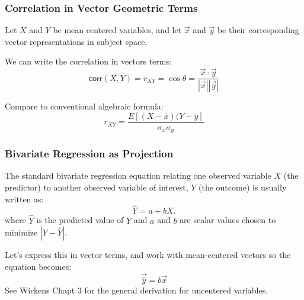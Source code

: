 \documentclass{beamer}
\begin{document}
\begin{frame}
  \frametitle{Correlation in Vector Geometric Terms}

Let $X$ and $Y$ be mean centered variables, and let $\vec{x}$ and $\vec{y}$ be their corresponding vector representations in subject space.

\begin{center}

\end{center}

We can write the correlation in vectors terms:
\[
\mathsf{corr}(X,Y) = r_{XY} = \cos \theta = \frac{\vec{x} \cdot \vec{y}}{|\vec{x}||\vec{y}|}
\]

Compare to conventional algebraic formula:
\[
r_{XY} =  \frac{E[(X - \bar{x})(Y - \bar{y}]}{\sigma_x \sigma_y}
\]


\end{frame}


\begin{frame}
  \frametitle{Bivariate Regression as Projection}

The standard bivariate regression equation relating one observed variable $X$ (the predictor) to another observed variable of interest, $Y$ (the outcome) is usually written as:
\[
\widehat{Y} = a + bX.
\]
where $\widehat{Y}$ is the predicted value of $Y$ and $a$ and $b$ are scalar values chosen to minimize $|Y-\widehat{Y}|$.

\medskip

Let's express this in vector terms, and work with mean-centered vectors so the equation becomes:
\[
\vec{\widehat{y}} = b\vec{x}
\]
See Wickens Chapt 3 for the general derivation for uncentered variables.

\end{frame}
\end{document}
